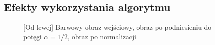 \documentclass[a4paper,12pt, titlepage]{report}
\begin{document}
\subsection*{Efekty wykorzystania algorytmu}
\begin{figure}[h]
    \centering
    \caption{[Od lewej] Barwowy obraz wejściowy, obraz po podniesieniu do potęgi \(\alpha=1/2\), obraz po normalizacji}%
    \label{fig:geo_after_grey1}%
\end{figure}
\FloatBarrier
\end{document}
